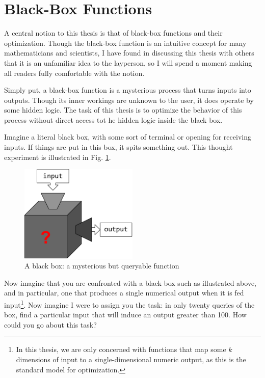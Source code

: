 \section{Black-Box Functions}
A central notion to this thesis is that of black-box functions and their optimization. Though the black-box function is an intuitive concept for many mathematicians and scientists, I have found in discussing this thesis with others that it is an unfamiliar idea to the layperson, so I will spend a moment making all readers fully comfortable with the notion.

Simply put, a black-box function is a mysterious process that turns inputs into outputs. Though its inner workings are unknown to the user, it does operate by some hidden logic. The task of this thesis is to optimize the behavior of this process without direct access tot he hidden logic inside the black box.

Imagine a literal black box, with some sort of terminal or opening for receiving inputs. If things are put in this box, it spits something out. This thought experiment is illustrated in Fig. \ref{fig:black_box}.

\begin{figure}[h]
	\centering
	\includegraphics[width=0.5\textwidth]{images/blackbox}
	\caption{A black box: a mysterious but queryable function}
	\label{fig:black_box}

\end{figure}

Now imagine that you are confronted with a black box such as illustrated above, and in particular, one that produces a single numerical output when it is fed input\footnote{In this thesis, we are only concerned with functions that map some $k$ dimensions of input to a single-dimensional numeric output, as this is the standard model for optimization.}. Now imagine I were to assign you the task: in only twenty queries of the box, find a particular input that will induce an output greater than 100. How could you go about this task?

